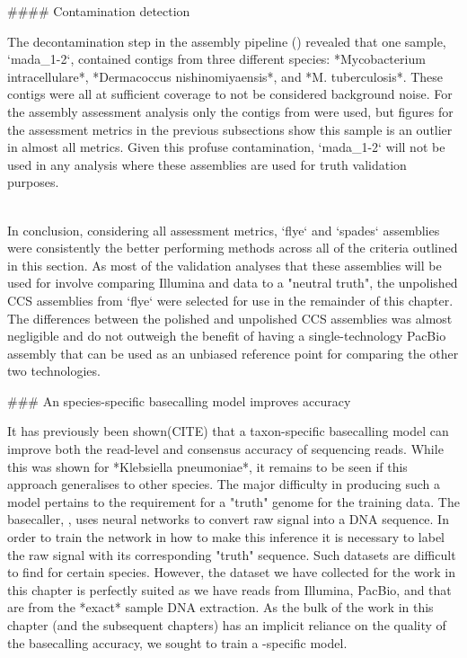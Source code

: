 \begin{markdown}

#### Contamination detection

The decontamination step in the assembly pipeline () revealed that one sample, `mada_1-2`, contained contigs from three different species: *Mycobacterium intracellulare*, *Dermacoccus nishinomiyaensis*, and *M. tuberculosis*. These contigs were all at sufficient coverage to not be considered background noise. For the assembly assessment analysis only the contigs from \mtb{} were used, but figures for the assessment metrics in the previous subsections show this sample is an outlier in almost all metrics. Given this profuse contamination, `mada_1-2` will not be used in any analysis where these assemblies are used for truth validation purposes.

\\

In conclusion, considering all assessment metrics, `flye` and `spades` assemblies were consistently the better performing methods across all of the criteria outlined in this section. As most of the validation analyses that these assemblies will be used for involve comparing Illumina and \ont{} data to a "neutral truth", the unpolished CCS assemblies from `flye` were selected for use in the remainder of this chapter. The differences between the polished and unpolished CCS assemblies was almost negligible and do not outweigh the benefit of having a single-technology PacBio assembly that can be used as an unbiased reference point for comparing the other two technologies.


### An \mtb{} species-specific \ont{} basecalling model improves accuracy

It has previously been shown(CITE) that a taxon-specific basecalling model can improve both the read-level and consensus accuracy of \ont{} sequencing reads. While this was shown for *Klebsiella pneumoniae*, it remains to be seen if this approach generalises to other species. The major difficulty in producing such a model pertains to the requirement for a "truth" genome for the training data. The \ont{} basecaller, \guppy{}, uses neural networks to convert raw signal into a DNA sequence. In order to train the network in how to make this inference it is necessary to label the raw signal with its corresponding "truth" sequence. Such datasets are difficult to find for certain species. However, the dataset we have collected for the work in this chapter is perfectly suited as we have reads from Illumina, PacBio, and \ont{} that are from the *exact* sample DNA extraction. As the bulk of the work in this chapter (and the subsequent chapters) has an implicit reliance on the quality of the \ont{} basecalling accuracy, we sought to train a \mtb{}-specific \guppy{} model.  


\end{markdown}
